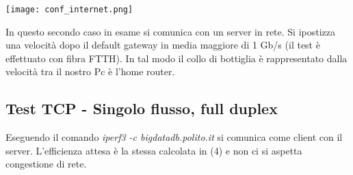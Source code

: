 \documentclass[../lab2.tex]{subfiles}
\begin{document}
\begin{center}
    \texttt{[image: conf\_internet.png]}
\end{center}
In questo secondo caso in esame si comunica con un server in rete.
Si ipostizza una velocità dopo il default gateway in media maggiore
di 1 Gb/s (il test è effettuato con fibra FTTH). In tal modo il collo 
di bottiglia è rappresentato dalla velocità tra il nostro Pc è l'home router.

\subsection{Test TCP - Singolo flusso, full duplex}
Eseguendo il comando \textit{iperf3 -c bigdatadb.polito.it} si comunica come 
client con il server. L'efficienza attesa è la stessa calcolata in (4) e 
non ci si aspetta congestione di rete.
\end{document}
